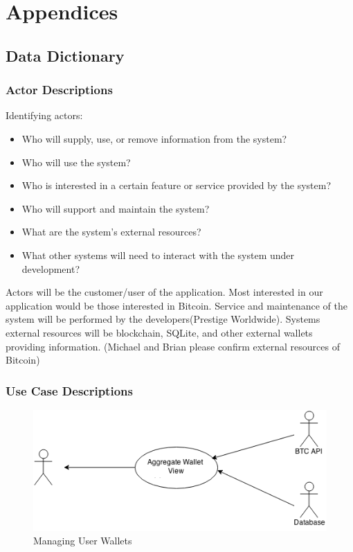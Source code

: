 \renewcommand\thefigure{\thesection.\arabic{figure}}   

\clearpage
\section{Appendices}
  \subsection{Data Dictionary}
    \subsubsection{Actor Descriptions}

    
Identifying actors:\\
\begin{itemize}
  \item Who will supply, use, or remove information from the system?
  \item Who will use the system?
  \item Who is interested in a certain feature or service provided by the system?
  \item Who will support and maintain the system?
  \item What are the system's external resources?
  \item What other systems will need to interact with the system under development?
\end{itemize}

Actors will be the customer/user of the application.  Most interested in our application would be those interested in Bitcoin. Service and maintenance of the system will be performed by the developers(Prestige Worldwide). Systems external resources will be blockchain, SQLite, and other external wallets providing information. (Michael and Brian please confirm external resources of Bitcoin)

  \subsubsection{Use Case Descriptions}

  

  \begin{figure}[H]
    \centering
    \includegraphics[scale=0.6]{../diagrams/usecase_3_5.png}
    \caption{Managing User Wallets}
  \end{figure}

